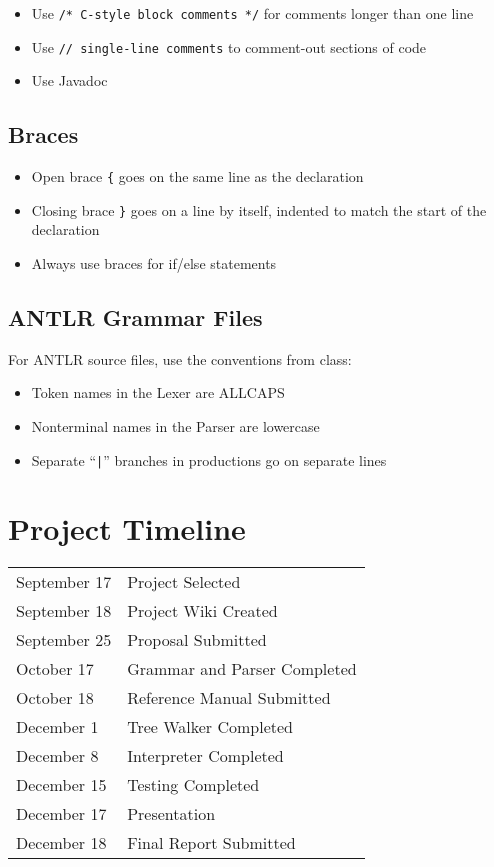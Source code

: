 \begin{itemize}
\item Use \verb|/* C-style block comments */| for comments longer than one line
\item Use \verb|// single-line comments| to comment-out sections of code
\item Use Javadoc\cite{javadoc}
\end{itemize}

\subsection{Braces}

\begin{itemize}
\item Open brace \verb|{| goes on the same line as the declaration
\item Closing brace \verb|}| goes on a line by itself, indented to match the start of the declaration
\item Always use braces for if/else statements 
\end{itemize}

\subsection{ANTLR Grammar Files}

For ANTLR source files, use the conventions from class:

\begin{itemize}
\item Token names in the Lexer are ALLCAPS
\item Nonterminal names in the Parser are lowercase
\item Separate ``\verb+|+'' branches in productions go on separate lines 
\end{itemize}




\section{Project Timeline}

\begin{tabular}{ll}
September 17 & Project Selected \\
September 18 & Project Wiki Created \\
September 25 & Proposal Submitted \\
October 17   & Grammar and Parser Completed \\
October 18   & Reference Manual Submitted \\
December 1   & Tree Walker Completed \\
December 8   & Interpreter Completed \\
December 15  & Testing Completed \\
December 17  & Presentation \\
December 18  & Final Report Submitted
\end{tabular}




